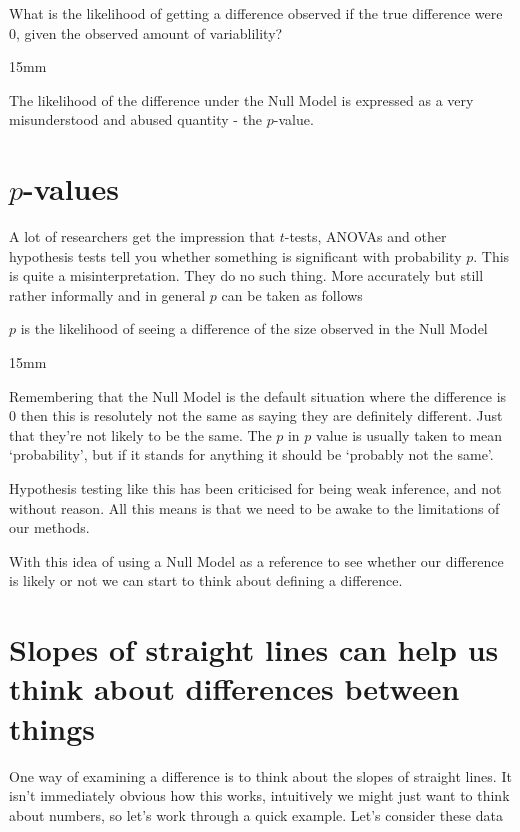 \documentclass[
]{book}
\newenvironment{myquote}
{\begin{large}
\begin{itshape}
\begin{minipage}{6cm}
}
{
\begin{vspace}{15mm}
\end{vspace}
\end{minipage}
\end{itshape}
\end{large} 
}
\begin{document}
\begin{myquote}
What is the likelihood of getting a difference observed if the true difference were 0, given the observed amount of variablility?
\end{myquote}

The likelihood of the difference under the Null Model is expressed as a very misunderstood and abused quantity - the \(p\)-value.

\hypertarget{p-values}{%
\section{\texorpdfstring{\(p\)-values}{p-values}}\label{p-values}}

A lot of researchers get the impression that \(t\)-tests, ANOVAs and other hypothesis tests tell you whether something is significant with probability \(p\). This is quite a misinterpretation. They do no such thing. More accurately but still rather informally and in general \(p\) can be taken as follows

\begin{myquote}
\(p\) is the likelihood of seeing a difference of the size observed in the Null Model
\end{myquote}

Remembering that the Null Model is the default situation where the difference is 0 then this is resolutely not the same as saying they are definitely different. Just that they're not likely to be the same. The \(p\) in \(p\) value is usually taken to mean `probability', but if it stands for anything it should be `probably not the same'.

Hypothesis testing like this has been criticised for being weak inference, and not without reason. All this means is that we need to be awake to the limitations of our methods.

With this idea of using a Null Model as a reference to see whether our difference is likely or not we can start to think about defining a difference.

\hypertarget{slopes-of-straight-lines-can-help-us-think-about-differences-between-things}{%
\section{Slopes of straight lines can help us think about differences between things}\label{slopes-of-straight-lines-can-help-us-think-about-differences-between-things}}

One way of examining a difference is to think about the slopes of straight lines. It isn't immediately obvious how this works, intuitively we might just want to think about numbers, so let's work through a quick example. Let's consider these data
\end{document}
